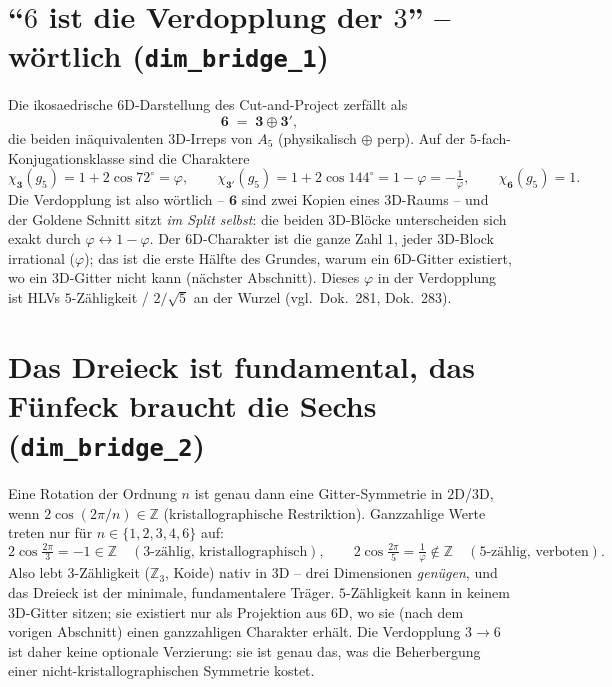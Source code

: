 \section{``$6$ ist die Verdopplung der $3$'' -- wörtlich (\texttt{dim\_bridge\_1})}
Die ikosaedrische $6$D-Darstellung des Cut-and-Project zerfällt als
\begin{equation}
\mathbf{6} \;=\; \mathbf{3}\oplus\mathbf{3'},
\end{equation}
die beiden inäquivalenten $3$D-Irreps von $A_5$ (physikalisch $\oplus$ perp). Auf der
$5$-fach-Konjugationsklasse sind die Charaktere
\begin{equation}
\chi_{\mathbf 3}(g_5)=1+2\cos 72^\circ=\varphi,\qquad
\chi_{\mathbf 3'}(g_5)=1+2\cos144^\circ=1-\varphi=-\tfrac1\varphi,\qquad
\chi_{\mathbf 6}(g_5)=1.
\end{equation}
Die Verdopplung ist also wörtlich -- $\mathbf 6$ sind zwei Kopien eines $3$D-Raums -- und
der Goldene Schnitt sitzt \emph{im Split selbst}: die beiden $3$D-Blöcke unterscheiden sich
exakt durch $\varphi\leftrightarrow 1-\varphi$. Der $6$D-Charakter ist die ganze Zahl $1$,
jeder $3$D-Block irrational ($\varphi$); das ist die erste Hälfte des Grundes, warum ein
$6$D-Gitter existiert, wo ein $3$D-Gitter nicht kann (nächster Abschnitt). Dieses $\varphi$
in der Verdopplung ist HLVs $5$-Zähligkeit / $2/\sqrt5$ an der Wurzel (vgl.\ Dok.~281,
Dok.~283).

\section{Das Dreieck ist fundamental, das Fünfeck braucht die Sechs (\texttt{dim\_bridge\_2})}
Eine Rotation der Ordnung $n$ ist genau dann eine Gitter-Symmetrie in $2$D/$3$D, wenn
$2\cos(2\pi/n)\in\mathbb{Z}$ (kristallographische Restriktion). Ganzzahlige Werte treten
nur für $n\in\{1,2,3,4,6\}$ auf:
\begin{equation}
2\cos\tfrac{2\pi}{3}=-1\in\mathbb{Z}\quad(\text{3-zählig, kristallographisch}),\qquad
2\cos\tfrac{2\pi}{5}=\tfrac1\varphi\notin\mathbb{Z}\quad(\text{5-zählig, verboten}).
\end{equation}
Also lebt $3$-Zähligkeit ($\mathbb{Z}_3$, Koide) nativ in $3$D -- drei Dimensionen
\emph{genügen}, und das Dreieck ist der minimale, fundamentalere Träger. $5$-Zähligkeit
kann in keinem $3$D-Gitter sitzen; sie existiert nur als Projektion aus $6$D, wo sie (nach
dem vorigen Abschnitt) einen ganzzahligen Charakter erhält. Die Verdopplung $3\to6$ ist
daher keine optionale Verzierung: sie ist genau das, was die Beherbergung einer
nicht-kristallographischen Symmetrie kostet.

